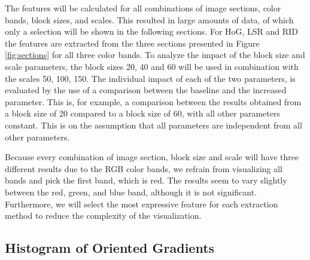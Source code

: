 The features will be calculated for all combinations of image sections, color bands, block sizes, and scales. This resulted in large amounts of data, of which only a selection will be shown in the following sections. For HoG, LSR and RID the features are extracted from the three sections presented in Figure
\ref{fig:sections} for all three color bands. To analyze the impact of the block size and scale parameters, the block sizes 20, 40 and 60 will be used in combination with the scales 50, 100, 150. The individual
impact of each of the two parameters, is evaluated by the use of a comparison between the baseline and the increased parameter. This is, for example, a comparison between the results obtained from a block size of 20 compared to a block size of 60, with all other parameters constant. This is on the assumption that all parameters are independent from all other parameters.

Because every combination of image section, block size and scale will have three different results due to the RGB color bands, we refrain from visualizing all bands and pick the first band, which is red. The results seem to vary slightly between the red, green, and blue band, although it is not significant. Furthermore, we will select the most expressive feature for each extraction method to reduce the complexity of the visualization.

\subsection{Histogram of Oriented Gradients}


